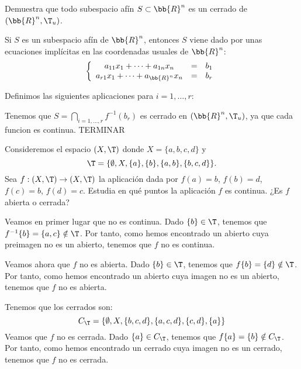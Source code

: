 \begin{ejercicio}
    Demuestra que todo subespacio afín $S \subset \bb{R}^n$ es un cerrado de $(\bb{R}^n, \T_u)$.
    
    Si $S$ es un subespacio afín de $\bb{R}^n$, entonces $S$ viene dado por unas ecuaciones implícitas en las coordenadas usuales de $\bb{R}^n$:
    \begin{equation*}
        \left\{
            \begin{array}{ccc}
                 a_{11}x_1 + \dots + a_{1n}x_n &=& b_1 \\
                 a_{r1}x_1 + \dots + a_{\bb{R}^n}x_n &=& b_r
            \end{array}
        \right.
    \end{equation*}

    Definimos las siguientes aplicaciones para $i=1,\dots,r$:

    Tenemos que $S=\bigcap\limits_{i=1,\dots,r}f^{-1}(b_r)$ es cerrado en $(\bb{R}^n,\T_u)$, ya que cada funcion es continua. TERMINAR
\end{ejercicio}

\begin{ejercicio}
    Consideremos el espacio $(X, \T )$ donde $X = \{a, b, c, d\}$ y
    \begin{equation*}
        \T = \{\emptyset, X, \{a\}, \{b\}, \{a, b\}, \{b, c, d\}\}.
    \end{equation*}
    Sea $f : (X, \T ) \to (X, \T )$ la aplicación dada por $f(a) = b$, $f(b) = d$, $f(c) = b$, $f(d) = c$.
    Estudia en qué puntos la aplicación $f$ es continua. ¿Es $f$ abierta o cerrada?

    Veamos en primer lugar que no es continua. Dado $\{b\}\in \T$, tenemos que $f^{-1}\{b\}=\{a,c\}\notin \T$. Por tanto, como hemos encontrado un abierto cuya preimagen no es un abierto, tenemos que $f$ no es continua.

    Veamos ahora que $f$ no es abierta. Dado $\{b\}\in \T$, tenemos que $f\{b\}=\{d\}\notin \T$. Por tanto, como hemos encontrado un abierto cuya imagen no es un abierto, tenemos que $f$ no es abierta.

    Tenemos que los cerrados son:
    \begin{equation*}
        C_\T=\{\emptyset, X, \{b,c,d\}, \{a,c,d\}, \{c,d\}, \{a\}\}
    \end{equation*}
    Veamos que $f$ no es cerrada. Dado $\{a\}\in C_\T$, tenemos que $f\{a\}=\{b\}\notin C_\T$. Por tanto, como hemos encontrado un cerrado cuya imagen no es un cerrado, tenemos que $f$ no es cerrada.
\end{ejercicio}


